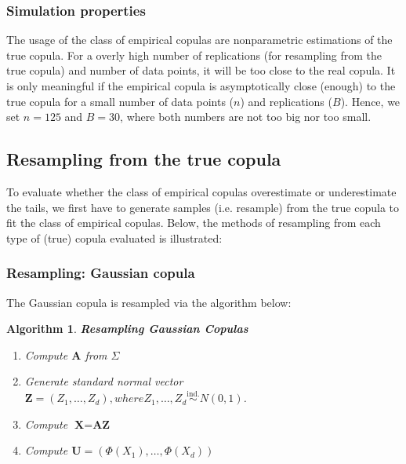 \documentclass[12pt]{report}
\newtheorem{algorithmold}{Algorithm}[section]
\newcommand{\1}{\mathbf{1}}
\begin{document}
\begin{flushleft}
\subsubsection{Simulation properties}
The usage of the class of empirical copulas are nonparametric estimations of the true copula. For a overly high number of replications (for resampling from the true copula) and number of data points, it will be too close to the real copula. It is only meaningful if the empirical copula is asymptotically close (enough) to the true copula for a small number of data points ($n$) and replications ($B$). Hence, we set $n = 125$ and $B = 30$, where both numbers are not too big nor too small.
\vspace{0.5cm}
\subsection{Resampling from the true copula}
\vspace{0.5cm}
To evaluate whether the class of empirical copulas overestimate or underestimate the tails, we first have to generate samples (i.e. resample) from the true copula to fit the class of empirical copulas. Below, the methods of resampling from each type of (true) copula evaluated is illustrated:

\subsubsection{Resampling: Gaussian copula}
The Gaussian copula is resampled via the algorithm below:
\begin{algorithmold}\label{GaussianCopulaResampling}
\textit{\normalfont\parencite{HofertBook}}\:
\textbf{Resampling Gaussian Copulas}\\
\begin{enumerate}
\item Compute $\textbf{A}$ from $\Sigma$
\item Generate standard normal vector $\textbf{Z} = (Z_{1}, \dots, Z_{d}), where Z_{1}, \dots, Z_{d} \overset{\text{ind.}}{\sim} N(0,1)$.
\item Compute $\textbf{X} = \textbf{AZ}$
\item Compute $\textbf{U} = (\Phi(X_{1}), \dots, \Phi(X_{d}))$
\end{enumerate}
\end{algorithmold}

\end{flushleft}
\end{document}
